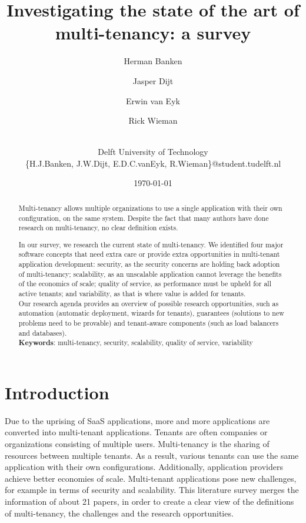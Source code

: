 \documentclass{article}
\title{Investigating the state of the art of multi-tenancy: a survey}
\author{Herman Banken\and
    Jasper Dijt\and
    Erwin van Eyk\and
    Rick Wieman\and
\\Delft University of Technology
\\\{H.J.Banken, J.W.Dijt, E.D.C.vanEyk, R.Wieman\}@student.tudelft.nl
}
\date{\today}
\begin{document}
\maketitle
\thispagestyle{empty}

\begin{abstract}
Multi-tenancy allows multiple organizations to use a single application with their own configuration, on the same system. Despite the fact that many authors have done research on multi-tenancy, no clear definition exists.

In our survey, we research the current state of multi-tenancy. We identified four major software concepts that need extra care or provide extra opportunities in multi-tenant application development: 
security, as the security concerns are holding back adoption of multi-tenancy; 
scalability, as an unscalable application cannot leverage the benefits of the economics of scale; 
quality of service, as performance must be upheld for all active tenants;
and variability, as that is where value is added for tenants. \\ 

Our research agenda provides an overview of possible research opportunities, such as automation (automatic deployment, wizards for tenants), guarantees (solutions to new problems need to be provable) and tenant-aware components (such as load balancers and databases).
\\

\textbf{Keywords}: multi-tenancy, security, scalability, quality of service, variability
\end{abstract}

\section{Introduction}
Due to the uprising of \ac{SaaS} applications, more and more applications are converted into multi-tenant applications. %
Tenants are often companies or organizations consisting of multiple users.
Multi-tenancy is the sharing of resources between multiple tenants.
As a result, various tenants can use the same application with their own configurations.
Additionally, application providers achieve better economies of scale. 
Multi-tenant applications pose new challenges, for example in terms of security and scalability. 
This literature survey merges the information of about 21 papers, in order to create a clear view of the definitions of multi-tenancy, the challenges and the research opportunities.
\end{document}
